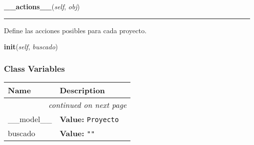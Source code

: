     \vspace{0.5ex}

\hspace{.8\funcindent}\begin{boxedminipage}{\funcwidth}

    \raggedright \textbf{\_\_actions\_\_}(\textit{self}, \textit{obj})

    \vspace{-1.5ex}

    \rule{\textwidth}{0.5\fboxrule}
\setlength{\parskip}{2ex}
    Define las acciones posibles para cada proyecto.

\setlength{\parskip}{1ex}
    \end{boxedminipage}

    \label{saip:controllers:desarrollo_proyecto_controller:ProyectoTableFiller:init}

    \vspace{0.5ex}

\hspace{.8\funcindent}\begin{boxedminipage}{\funcwidth}

    \raggedright \textbf{init}(\textit{self}, \textit{buscado})

\setlength{\parskip}{2ex}
\setlength{\parskip}{1ex}
    \end{boxedminipage}



  \subsubsection{Class Variables}

    \vspace{-1cm}
\hspace{\varindent}\begin{longtable}{|p{\varnamewidth}|p{\vardescrwidth}|l}
\cline{1-2}
\cline{1-2} \centering \textbf{Name} & \centering \textbf{Description}& \\
\cline{1-2}
\endhead\cline{1-2}\multicolumn{3}{r}{\small\textit{continued on next page}}\\\endfoot\cline{1-2}
\endlastfoot\raggedright \_\-\_\-m\-o\-d\-e\-l\-\_\-\_\- & \raggedright \textbf{Value:} 
{\tt Proyecto}&\\
\cline{1-2}
\raggedright b\-u\-s\-c\-a\-d\-o\- & \raggedright \textbf{Value:} 
{\tt ""}&\\
\cline{1-2}
\end{longtable}

